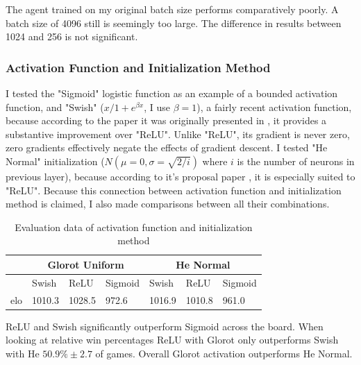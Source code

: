 \noindent
The agent trained on my original batch size performs comparatively poorly. A batch size of 4096 still is seemingly too large. The difference in results between 1024 and 256 is not significant.


\subsubsection{Activation Function and Initialization Method}\label{subsubsec:tr:opt_alg:params:batch}
 I tested the "Sigmoid" logistic function as an example of a bounded activation function, and "Swish" ($x/1+e^{\beta x}$, I use $\beta = 1$),  a fairly recent activation function, because according to the paper it was originally presented in \cite{ramachandran2017searching}, it provides a substantive improvement over "ReLU". Unlike "ReLU", its gradient is never zero, zero gradients effectively negate the effects of gradient descent. I tested "He Normal" initialization ($N(\mu = 0, \sigma = \sqrt{2/i})$ where $i$ is the number of neurons in previous layer), because according to it's proposal paper \cite{He_2015_ICCV}, it is especially suited to "ReLU". Because this connection between activation function and initialization method is claimed, I also made comparisons between all their combinations.

\begin{table}[H]
\begin{center}
\begin{tabular}{ |l|p{1.25cm}|p{1.25cm}|p{1.25cm}||p{1.25cm}|p{1.25cm}|p{1.25cm}|  }
 \hline
 & \multicolumn{3}{c||}{Glorot Uniform} & \multicolumn{3}{c|}{He Normal}\\
 \hline
 \hline
  & Swish & ReLU & Sigmoid & Swish & ReLU & Sigmoid \\
 \hline
 elo & 1010.3 & 1028.5 & 972.6 & 1016.9 & 1010.8 & 961.0 \\
 \hline
\end{tabular}
\end{center}
\caption{Evaluation data of activation function and initialization method}
\label{tab:elo_activation_init}
\end{table}
\noindent
ReLU and Swish significantly outperform Sigmoid across the board. When looking at relative win percentages ReLU with Glorot only outperforms Swish with He $50.9\% \pm 2.7$ of games. Overall Glorot activation outperforms He Normal. 





